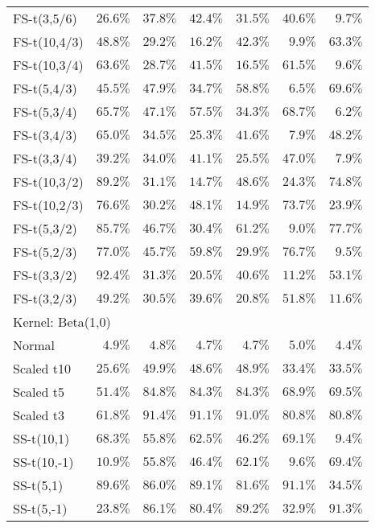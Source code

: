 \begin{longtable}{lrrrrrr}
FS-t(3,5/6) & $26.6\%$ & $37.8\%$ & $42.4\%$ & $31.5\%$ & $40.6\%$ & $9.7\%$ \\ 
FS-t(10,4/3) & $48.8\%$ & $29.2\%$ & $16.2\%$ & $42.3\%$ & $9.9\%$ & $63.3\%$ \\ 
FS-t(10,3/4) & $63.6\%$ & $28.7\%$ & $41.5\%$ & $16.5\%$ & $61.5\%$ & $9.6\%$ \\ 
FS-t(5,4/3) & $45.5\%$ & $47.9\%$ & $34.7\%$ & $58.8\%$ & $6.5\%$ & $69.6\%$ \\ 
FS-t(5,3/4) & $65.7\%$ & $47.1\%$ & $57.5\%$ & $34.3\%$ & $68.7\%$ & $6.2\%$ \\ 
FS-t(3,4/3) & $65.0\%$ & $34.5\%$ & $25.3\%$ & $41.6\%$ & $7.9\%$ & $48.2\%$ \\ 
FS-t(3,3/4) & $39.2\%$ & $34.0\%$ & $41.1\%$ & $25.5\%$ & $47.0\%$ & $7.9\%$ \\ 
FS-t(10,3/2) & $89.2\%$ & $31.1\%$ & $14.7\%$ & $48.6\%$ & $24.3\%$ & $74.8\%$ \\ 
FS-t(10,2/3) & $76.6\%$ & $30.2\%$ & $48.1\%$ & $14.9\%$ & $73.7\%$ & $23.9\%$ \\ 
FS-t(5,3/2) & $85.7\%$ & $46.7\%$ & $30.4\%$ & $61.2\%$ & $9.0\%$ & $77.7\%$ \\ 
FS-t(5,2/3) & $77.0\%$ & $45.7\%$ & $59.8\%$ & $29.9\%$ & $76.7\%$ & $9.5\%$ \\ 
FS-t(3,3/2) & $92.4\%$ & $31.3\%$ & $20.5\%$ & $40.6\%$ & $11.2\%$ & $53.1\%$ \\ 
FS-t(3,2/3) & $49.2\%$ & $30.5\%$ & $39.6\%$ & $20.8\%$ & $51.8\%$ & $11.6\%$ \\ 
\midrule
\multicolumn{7}{l}{Kernel: Beta(1,0)} \\ 
\midrule
Normal & $4.9\%$ & $4.8\%$ & $4.7\%$ & $4.7\%$ & $5.0\%$ & $4.4\%$ \\ 
Scaled t10 & $25.6\%$ & $49.9\%$ & $48.6\%$ & $48.9\%$ & $33.4\%$ & $33.5\%$ \\ 
Scaled t5 & $51.4\%$ & $84.8\%$ & $84.3\%$ & $84.3\%$ & $68.9\%$ & $69.5\%$ \\ 
Scaled t3 & $61.8\%$ & $91.4\%$ & $91.1\%$ & $91.0\%$ & $80.8\%$ & $80.8\%$ \\ 
SS-t(10,1) & $68.3\%$ & $55.8\%$ & $62.5\%$ & $46.2\%$ & $69.1\%$ & $9.4\%$ \\ 
SS-t(10,-1) & $10.9\%$ & $55.8\%$ & $46.4\%$ & $62.1\%$ & $9.6\%$ & $69.4\%$ \\ 
SS-t(5,1) & $89.6\%$ & $86.0\%$ & $89.1\%$ & $81.6\%$ & $91.1\%$ & $34.5\%$ \\ 
SS-t(5,-1) & $23.8\%$ & $86.1\%$ & $80.4\%$ & $89.2\%$ & $32.9\%$ & $91.3\%$ \\ 

\end{longtable}
